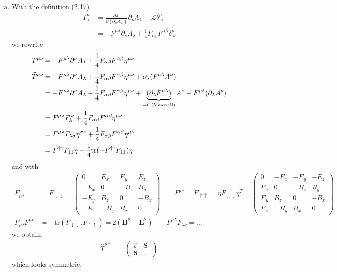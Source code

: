 \documentclass[10pt,a4paper]{book}
\theoremstyle{definition}
\begin{document}
\begin{enumerate}[(a)]
\item With the definition (2.17)
\begin{align}
T^\mu_{\;\nu}&=\frac{\partial\mathcal{L}}{\partial(\partial_\mu A_\lambda)}\partial_\nu A_\lambda-\mathcal{L}\delta^\mu_{\;\nu}\\
&=-F^{\mu\lambda}\partial_\nu A_\lambda+\frac{1}{4}F_{\alpha\beta}F^{\alpha\beta}\delta^\mu_{\;\nu}
\end{align}
we rewrite
\begin{align}
T^{\mu\nu}
&=-F^{\mu\lambda}\partial^\nu A_\lambda+\frac{1}{4}F_{\alpha\beta}F^{\alpha\beta}\eta^{\mu\nu}\\
\widehat{T}^{\mu\nu}
&=-F^{\mu\lambda}\partial^\nu A_\lambda+\frac{1}{4}F_{\alpha\beta}F^{\alpha\beta}\eta^{\mu\nu}+
\partial_\lambda(F^{\mu\lambda}A^\nu)\\
&=-F^{\mu\lambda}\partial^\nu A_\lambda+\frac{1}{4}F_{\alpha\beta}F^{\alpha\beta}\eta^{\mu\nu}+
\underbrace{(\partial_\lambda F^{\mu\lambda})}_{=0\text{\;(Maxwell)}}A^\nu+F^{\mu\lambda}(\partial_\lambda A^\nu)\\
&=F^{\mu\lambda}F_\lambda^{\,\nu}+\frac{1}{4}F_{\alpha\beta}F^{\alpha\beta}\eta^{\mu\nu}\\
&=F^{\mu\lambda}F_{\lambda\sigma}\eta^{\sigma\nu}+\frac{1}{4}F_{\alpha\beta}F^{\alpha\beta}\eta^{\mu\nu}\\
&=F^{\uparrow\uparrow}F_{\downarrow\downarrow}\eta+\frac{1}{4}\text{tr}(-F^{\uparrow\uparrow}F_{\downarrow\downarrow})\eta
\end{align}
and with
\begin{align}
F_{\mu\nu}&=F_{\downarrow\downarrow}=\begin{pmatrix}
0    &  E_x & E_y  & E_z\\
-E_x &  0   & -B_z & B_y\\
-E_y &  B_z & 0    & -B_x\\
-E_z & -B_y & B_x  & 0
\end{pmatrix}
\qquad
F^{\mu\nu}=F_{\uparrow\uparrow}=\eta F_{\downarrow\downarrow}\eta^T=\begin{pmatrix}
0    &  -E_x & -E_y  & -E_z\\
E_x &  0   & -B_z & B_y\\
E_y &  B_z & 0    & -B_x\\
E_z & -B_y & B_x  & 0
\end{pmatrix}\\
F_{\mu\nu}F^{\mu\nu}&=-\text{tr}(F_{\downarrow\downarrow}.F_{\uparrow\uparrow})=2(\mathbf{B}^2-\mathbf{E}^2)
\qquad
F^{\mu\lambda}F_{\lambda\nu}=...
\end{align}
we obtain
\begin{align}
\widehat{T}^{\mu\nu}
&=\begin{pmatrix}
\mathcal{E} & \mathbf{S} \\
\mathbf{S}  & ...
\end{pmatrix}
\end{align}
which looks symmetric.
\end{enumerate}
\end{document}
